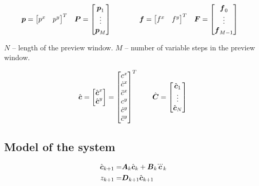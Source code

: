 \documentclass[12pt,a4paper]{article}
\begin{document}
\begin{align*}
\\
%
\fp = \begin{bmatrix} p^x & p^y \end{bmatrix}^T
\quad &
\FP = \begin{bmatrix} \fp_1 \\ \vdots \\ \fp_M \end{bmatrix}
\quad\quad\quad&
\fd = \begin{bmatrix} f^x & f^y \end{bmatrix}^T
\quad &
\FD = \begin{bmatrix} \fd_0 \\ \vdots \\ \fd_{M-1} \end{bmatrix}
\end{align*}

$N$ -- length of the preview window.
$M$ -- number of variable steps in the preview window.

\begin{equation*}
\hat{\mbox{\boldmath $c$}} = \begin{bmatrix} \hat{\mbox{\boldmath $c$}}^x \\ \hat{\mbox{\boldmath $c$}}^y \end{bmatrix} =
          \begin{bmatrix} c^x \\ \dot{c}^x \\ \ddot{c}^x \\ c^y \\ \dot{c}^y \\ \ddot{c}^y \end{bmatrix}^T
\quad\quad
\hat{\mbox{\boldmath $C$}} = \begin{bmatrix} \hat{\mbox{\boldmath $c$}}_1 \\ \vdots \\ \hat{\mbox{\boldmath $c$}}_N \end{bmatrix}\\
\end{equation*}




\subsection{Model of the system}
\begin{align*}
\cstate_{k+1} =& \M{A}_k \cstate_k + \M{B}_k \cjerk_k\\
z_{k+1} =& \M{D}_{k+1} \cstate_{k+1}
\end{align*}
\end{document}
